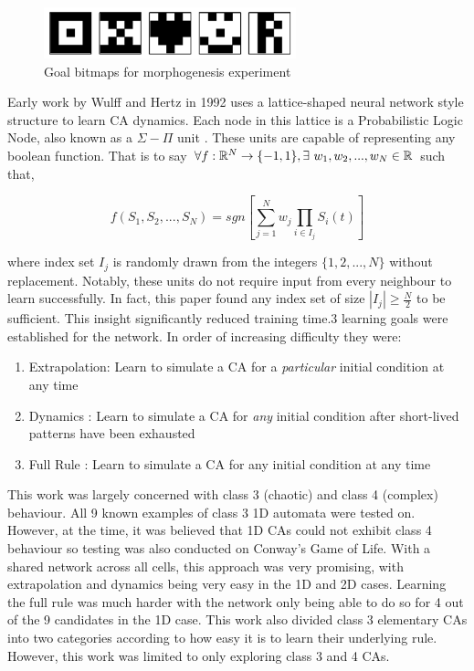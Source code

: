 \begin{figure}[!h]
\centering
\includegraphics[width=.5\textwidth]{images/bitmap-goals.png}
\caption{Goal bitmaps for morphogenesis experiment\cite{breukelaar2004evolving}}
\label{fig:nca}
\end{figure}

Early work by Wulff and Hertz in 1992\cite{wulff1992learning} uses a lattice-shaped neural network style structure to learn CA dynamics. Each node in this lattice is a Probabilistic Logic Node, also known as a $\Sigma-\Pi$ unit \cite{gurney1992training}. These units are capable of representing any boolean function. That is to say $ \forall f: \mathbb{R}^N \to \{-1, 1\}, \exists~w_1, w_2, ... , w_N \in \mathbb{R} $ such that,

\begin{equation} \label{eq:sigma_pi}
f(S_1, S_2, ..., S_N) = sgn\left[ \sum_{j=1}^{N} w_j \prod_{i \in I_j} S_i(t) \right]
\end{equation}

where index set $I_j$ is randomly drawn from the integers $\{1, 2, ..., N\}$ without replacement. Notably, these units do not require input from every neighbour to learn successfully. In fact, this paper found any index set of size $|I_j| \geq \frac{N}{2}$ to be sufficient. This insight significantly reduced training time.3 learning goals were established for the network. In order of increasing difficulty they were:

\begin{enumerate}
  \item Extrapolation: Learn to simulate a CA for a \textit{particular} initial condition at any time
  \item Dynamics : Learn to simulate a CA for \textit{any} initial condition after short-lived patterns have been exhausted
  \item Full Rule : Learn to simulate a CA for any initial condition at any time
\end{enumerate}

This work was largely concerned with class 3 (chaotic) and class 4 (complex) behaviour.  All 9 known examples of class 3 1D automata were tested on. However, at the time, it was believed that 1D CAs could not exhibit class 4 behaviour so testing was also conducted on Conway's Game of Life. With a shared network across all cells, this approach was very promising, with extrapolation and dynamics being very easy in the 1D and 2D cases. Learning the full rule was much harder with the network only being able to do so for 4 out of the 9 candidates in the 1D case. This work also divided class 3 elementary CAs into two categories according to how easy it is to learn their underlying rule. However, this work was limited to only exploring class 3 and 4 CAs.\\

